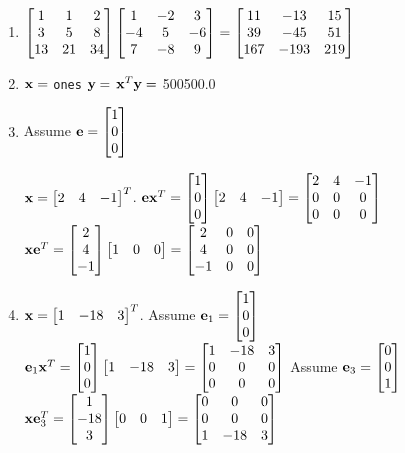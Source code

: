 \documentclass{article}
\begin{document}
\begin{enumerate}

\item $\bmat{ 1 & 1 & 2 \\ 3 & 5 & 8 \\ 13 & 21 & 34 } \bmat{ 1 & -2 & 3 \\ -4 & 5 & -6 \\ 7 & -8 & 9} =\bmat{11 & -13 & 15 \\ 39 & -45 & 51 \\ 167 & -193 & 219}$ \newline

\item $\vx =$ {\colorbox[rgb]{1.00,0.93,1.00}{\tt ones}} $\vy =$ {\colorbox[rgb]{1.00,0.93,1.00}{\tt {}}} $\vx^T \vy =$ 500500.0 \newline

\item Assume $\ve = \bmat{1\\0\\0} $

$\vx = \bmat{ 2 & 4 & -1}^T$. \newline 
$\ve \vx^T =\bmat{1\\0\\0}\bmat{ 2 & 4 & -1} = \bmat{2 & 4 & -1 \\ 0 & 0 & 0 \\ 0 & 0 & 0}$ \newline  
$\vx \ve^T =\bmat{2 \\ 4\\-1} \bmat{1 &0 &0} =  \bmat{2 & 0 & 0 \\ 4 & 0 & 0 \\ -1 & 0 & 0}$ \newline


\item 
$\vx = \bmat{1 & -18 & 3}^T$. \newline  
Assume $\ve_1 = \bmat{1\\0\\0} $ \newline
$\ve_1 \vx^T =\bmat{1\\0\\0}\bmat{1 & -18 & 3} =  \bmat{1 & -18 & 3 \\ 0 & 0 & 0 \\ 0 & 0 & 0}$ \newline 
Assume $\ve_3 = \bmat{0\\0\\1} $ \newline
$\vx \ve_3^T =\bmat{1 \\ -18 \\ 3} \bmat{0&0&1}=  \bmat{0 & 0 & 0 \\ 0 & 0 & 0\\1 & -18 & 3 }$ \newline


\end{enumerate}
\end{document}
